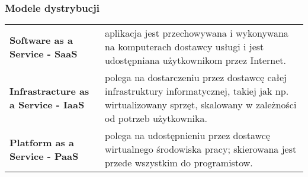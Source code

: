 \documentclass[a4paper]{article}
\begin{document}
    \subsubsection{Modele dystrybucji}

    \begin{table}[H]
        \begin{center}
            \begin{tabular}{ p{.4\linewidth} p{.6\linewidth}}
                \textbf{Software as a Service - SaaS}
                &
                aplikacja jest przechowywana i wykonywana na
                komputerach dostawcy usługi i jest udostępniana
                użytkownikom przez Internet.
                \\

                \cmidrule(r){1-1}\cmidrule(l){2-2}
                \textbf{Infrastracture as a Service - IaaS}
                &
                polega na dostarczeniu przez dostawcę całej infrastruktury
                informatycznej, takiej jak np. wirtualizowany sprzęt,
                skalowany w zależności od potrzeb użytkownika.
                \\

                \cmidrule(r){1-1}\cmidrule(l){2-2}
                \textbf{Platform as a Service - PaaS}
                &
                polega na udostępnieniu przez dostawcę wirtualnego
                środowiska pracy; skierowana jest przede wszystkim do
                programistow.
                \\
            \end{tabular}
        \end{center}
    \end{table}
\end{document}

